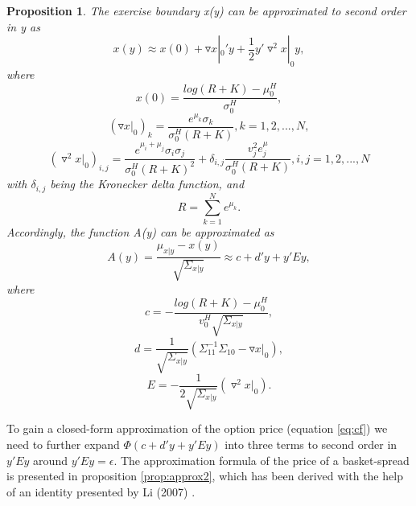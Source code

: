 \documentclass[a4paper]{article}
\newtheorem{prop}{Proposition}
\begin{document}
\begin{prop}
\label{prop:approx}
The exercise boundary x(y) can be approximated to second order in y as
\begin{equation}
x(y)\approx x(0)+\triangledown x|_0'y+\frac{1}{2}y'\triangledown^2x|_0y,
\end{equation}
where
\begin{equation}
x(0)=\frac{log(R+K)-\mu_0^H}{\sigma_0^H},
\end{equation}
\begin{equation}
(\triangledown x|_0)_k=\frac{e^{\mu_k}\sigma_k}{\sigma_0^H(R+K)},k=1,2,...,N,
\end{equation}
\begin{equation}
(\triangledown^2 x|_0)_{i,j}=\frac{e^{\mu_i+\mu_j}\sigma_i\sigma_j}{\sigma_0^H(R+K)^2}+\delta_{i,j}\frac{v_j^2e^\mu_j}{\sigma_0^H(R+K)},i,j=1,2,...,N
\end{equation}
with $\delta_{i,j}$ being the Kronecker delta function, and
\begin{equation}
R=\sum_{k=1}^Ne^{\mu_k}.
\end{equation}
Accordingly, the function A(y) can be approximated as
\begin{equation}
A(y)=\frac{\mu_{x|y}-x(y)}{\sqrt{\Sigma_{x|y}}}\approx c+d'y+y'Ey,
\end{equation}
where
\begin{equation}
c=-\frac{log(R+K)-\mu_0^H}{v_0^H\sqrt{\Sigma_{x|y}}},
\end{equation}
\begin{equation}
d=\frac{1}{\sqrt{\Sigma_{x|y}}}(\Sigma_{11}^{-1}\Sigma_{10}-\triangledown x|_0),
\end{equation}
\begin{equation}
E=-\frac{1}{2\sqrt{\Sigma_{x|y}}}(\triangledown^2 x|_0).
\end{equation}
\end{prop}
To gain a closed-form approximation of the option price (equation \ref{eq:cf}) we need to further expand $\Phi(c+d'y+y'Ey)$ into three terms to second order in $y'Ey$ around $y'Ey=\epsilon$. The approximation formula of the price of a basket-spread is presented in proposition \ref{prop:approx2}, which has been derived with the help of an identity presented by Li (2007) \cite{li}. 
\end{document}

